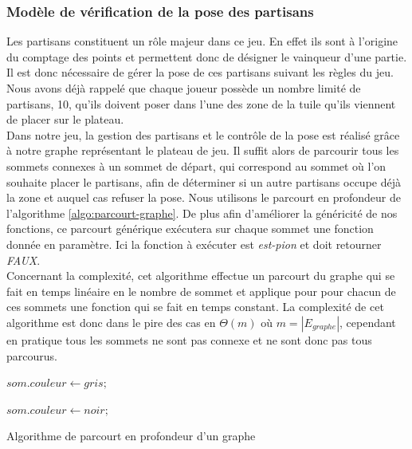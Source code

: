 \documentclass[a4paper, 11pt]{article}
\begin{document}
		\subsubsection{Modèle de vérification de la pose des partisans}\label{sec:pose-partisan-algo}
			\indent Les partisans constituent un rôle majeur dans ce jeu. En effet ils sont à l'origine du comptage des points et permettent donc de désigner le vainqueur d'une partie. Il est donc nécessaire de gérer la pose de ces partisans suivant les règles du jeu. Nous avons déjà rappelé que chaque joueur possède un nombre limité de partisans, 10, qu'ils doivent poser dans l'une des zone de la tuile qu'ils viennent de placer sur le plateau. \\
			\indent Dans notre jeu, la gestion des partisans et le contrôle de la pose est réalisé grâce à notre graphe représentant le plateau de jeu. Il suffit alors de parcourir tous les sommets connexes à un sommet de départ, qui correspond au sommet où l'on souhaite placer le partisans, afin de déterminer si un autre partisans occupe déjà la zone et auquel cas refuser la pose. Nous utilisons le parcourt en profondeur de l'algorithme \ref{algo:parcourt-graphe}. De plus afin d'améliorer la généricité de nos fonctions, ce parcourt générique exécutera sur chaque sommet une fonction donnée en paramètre. Ici la fonction à exécuter est \emph{est-pion} et doit retourner \emph{FAUX}. \\
			\indent Concernant la complexité, cet algorithme effectue un parcourt du graphe qui se fait en temps linéaire en le nombre de sommet et applique pour pour chacun de ces sommets une fonction qui se fait en temps constant. La complexité de cet algorithme est donc dans le pire des cas en $\Theta(m)$ où $m=|E_{graphe}|$, cependant en pratique tous les sommets ne sont pas connexe et ne sont donc pas tous parcourus.

		\begin{algorithm}[H]
		  \BlankLine
		  $som.couleur \leftarrow gris;$ \\


		  $som.couleur \leftarrow noir;$ \\
		  \caption{Algorithme de parcourt en profondeur d'un graphe}
		  \label{algo:parcourt-graphe}
		\end{algorithm}
\end{document}
